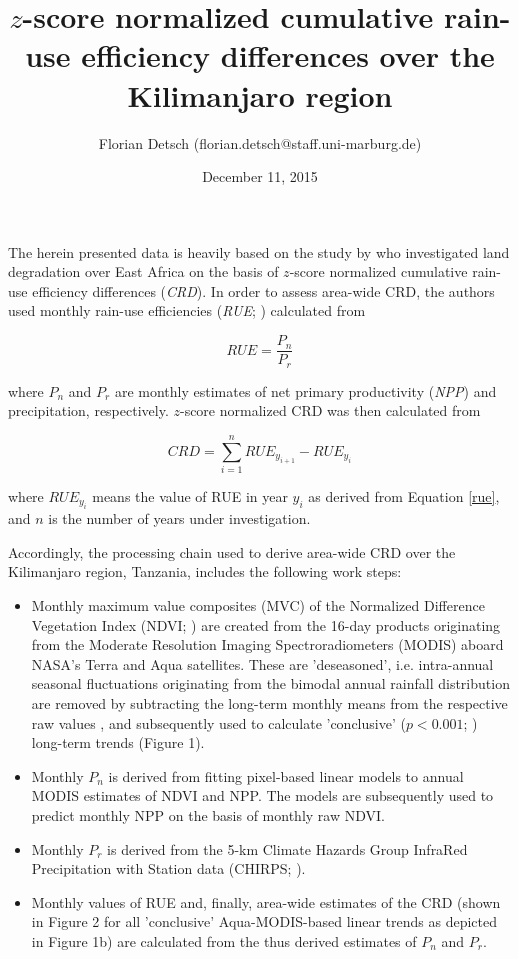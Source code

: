 \documentclass{article}
\title{$z$-score normalized cumulative rain-use efficiency differences over the Kilimanjaro region}
\author{Florian Detsch (florian.detsch@staff.uni-marburg.de)}
\date{December 11, 2015}
\begin{document}
\maketitle

The herein presented data is heavily based on the study by \citet{Landmann2014} who investigated land degradation over East Africa on the basis of $z$-score normalized cumulative rain-use efficiency differences (\textit{CRD}). In order to assess area-wide CRD, the authors used monthly rain-use efficiencies (\textit{RUE}; \cite{Prince1998a}) calculated from 

\begin{equation}
\label{rue}
\textit{RUE} = \frac{P_n}{P_r}
\end{equation}

where $P_n$ and $P_r$ are monthly estimates of net primary productivity (\textit{NPP}) and precipitation, respectively. $z$-score normalized CRD was then calculated from 

\begin{equation}
\textit{CRD} = \sum \limits_{i=1}^n \textit{RUE}_{y_{i+1}} - \textit{RUE}_{y_{i}}
\end{equation}

where $\textit{RUE}_{y_{i}}$ means the value of RUE in year $y_{i}$ as derived from Equation \ref{rue}, and $n$ is the number of years under investigation. 

Accordingly, the processing chain used to derive area-wide CRD over the Kilimanjaro region, Tanzania, includes the following work steps:

\begin{itemize}
\item Monthly maximum value composites (MVC) of the Normalized Difference Vegetation Index (NDVI; \citep{Tucker1979}) are created from the 16-day products originating from the Moderate Resolution Imaging Spectroradiometers (MODIS) aboard NASA's Terra and Aqua satellites. These are 'deseasoned', i.e. intra-annual seasonal fluctuations originating from the bimodal annual rainfall distribution \citep{Otte2015} are removed by subtracting the long-term monthly means from the respective raw values \citep{Appelhans2015b}, and subsequently used to calculate 'conclusive' ($p<0.001$; \citep{Miller1966}) long-term trends (Figure 1).

\item Monthly $P_n$ is derived from fitting pixel-based linear models to annual MODIS estimates of NDVI and NPP. The models are subsequently used to predict monthly NPP on the basis of monthly raw NDVI.

\item Monthly $P_r$ is derived from the 5-km Climate Hazards Group InfraRed Precipitation with Station data (CHIRPS; \citep{Funk2015}). 

\item Monthly values of RUE and, finally, area-wide estimates of the CRD (shown in Figure 2 for all 'conclusive' Aqua-MODIS-based linear trends as depicted in Figure 1b) are calculated from the thus derived estimates of $P_n$ and $P_r$. 
\end{itemize}
\end{document}

